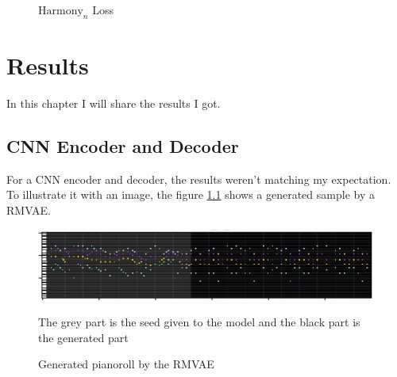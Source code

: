 \documentclass[12pt]{report}
\begin{document}
\begin{figure}[H]
\begin{minipage}{0.5\textwidth}
\begin{center}
        \end{center}
        \caption{$\text{Harmony}_n$ Loss}
        \label{fig:loss_harmony_n}
    \end{minipage}
\end{figure}

\chapter{Results}

In this chapter I will share the results I got.

\section{CNN Encoder and Decoder}

For a CNN encoder and decoder, the results weren't matching my expectation.
To illustrate it with an image, the figure \ref{fig:rmvae-generated} shows a generated sample by a RMVAE.

\begin{figure}[htpb]
    \centering
    \includegraphics[width=\textwidth]{images/generated_midis/RMVAE/generated_cnn.jpg}
    \caption{Generated pianoroll by the RMVAE}
    The grey part is the seed given to the model and the black part is the generated part
    \label{fig:rmvae-generated}
\end{figure}
\end{document}
